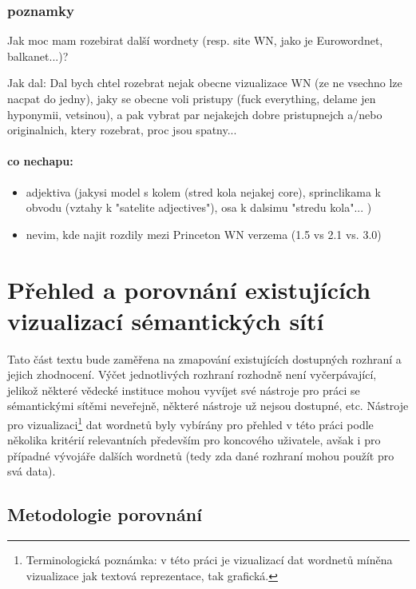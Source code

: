 \documentclass[a4paper, 11pt, oneside]{book}
\begin{document}
				

				\section*{poznamky}

				Jak moc mam rozebirat další wordnety (resp. site WN, jako je Eurowordnet, balkanet...)? 

				Jak dal: Dal bych chtel rozebrat nejak obecne vizualizace WN (ze ne vsechno lze nacpat do jedny), jaky se obecne voli pristupy (fuck everything, delame jen hyponymii, vetsinou), a pak vybrat par nejakejch dobre pristupnejch a/nebo originalnich, ktery rozebrat, proc jsou spatny...

				\subsection*{co nechapu:}

				\begin{itemize}
					\item adjektiva (jakysi model s kolem (stred kola nejakej core), sprinclikama k obvodu (vztahy k "satelite adjectives"), osa k dalsimu "stredu kola"... )
					\item nevim, kde najit rozdily mezi Princeton WN verzema (1.5 vs 2.1 vs. 3.0)
				\end{itemize}

	\part{Přehled a porovnání existujících vizualizací sémantických sítí}

		Tato část textu bude zaměřena na zmapování existujících dostupných rozhraní a jejich zhodnocení. Výčet jednotlivých rozhraní rozhodně není vyčerpávající, jelikož některé vědecké instituce mohou vyvíjet své nástroje pro práci se sémantickými sítěmi neveřejně, některé nástroje už nejsou dostupné, etc. Nástroje pro vizualizaci\footnote{Terminologická poznámka: v této práci je vizualizací dat wordnetů míněna vizualizace jak textová reprezentace, tak grafická.} dat wordnetů byly vybírány pro přehled v této práci podle několika kritérií relevantních především pro koncového uživatele, avšak i pro případné vývojáře dalších wordnetů (tedy zda dané rozhraní mohou použít pro svá data).

		\chapter{Metodologie porovnání}
\end{document}
